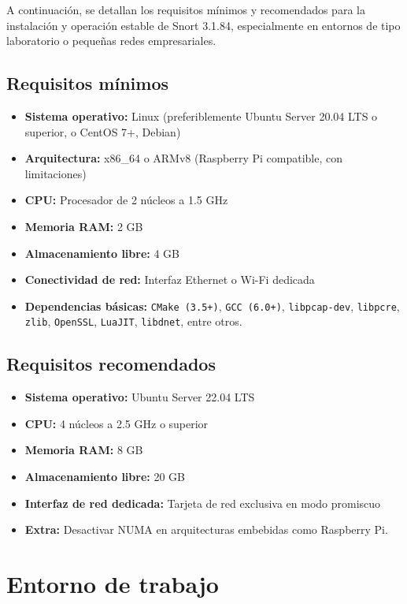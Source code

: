 \documentclass[12pt,a4paper]{report}
\begin{document}
A continuación, se detallan los requisitos mínimos y recomendados para la instalación y operación estable de Snort 3.1.84, especialmente en entornos de tipo laboratorio o pequeñas redes empresariales.

\subsection*{Requisitos mínimos}

\begin{itemize}
	\item \textbf{Sistema operativo:} Linux (preferiblemente Ubuntu Server 20.04 LTS o superior, o CentOS 7+, Debian)
	\item \textbf{Arquitectura:} x86\_64 o ARMv8 (Raspberry Pi compatible, con limitaciones)
	\item \textbf{CPU:} Procesador de 2 núcleos a 1.5 GHz
	\item \textbf{Memoria RAM:} 2 GB
	\item \textbf{Almacenamiento libre:} 4 GB
	\item \textbf{Conectividad de red:} Interfaz Ethernet o Wi-Fi dedicada
	\item \textbf{Dependencias básicas:} \texttt{CMake (3.5+)}, \texttt{GCC (6.0+)}, \texttt{libpcap-dev}, \texttt{libpcre}, \texttt{zlib}, \texttt{OpenSSL}, \texttt{LuaJIT}, \texttt{libdnet}, entre otros.
\end{itemize}

\subsection*{Requisitos recomendados}

\begin{itemize}
	\item \textbf{Sistema operativo:} Ubuntu Server 22.04 LTS
	\item \textbf{CPU:} 4 núcleos a 2.5 GHz o superior
	\item \textbf{Memoria RAM:} 8 GB
	\item \textbf{Almacenamiento libre:} 20 GB
	\item \textbf{Interfaz de red dedicada:} Tarjeta de red exclusiva en modo promiscuo
	\item \textbf{Extra:} Desactivar NUMA en arquitecturas embebidas como Raspberry Pi.
\end{itemize}

\section{Entorno de trabajo}
\end{document}
